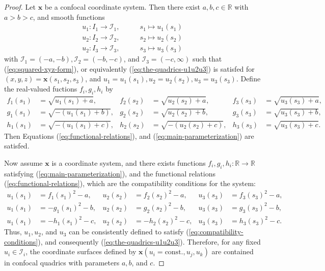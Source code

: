 \documentclass[10pt, a4paper]{article}
\theoremstyle{BoldTopSpacing}
\theoremstyle{BoldTopSpacing}
\theoremstyle{BoldTopSpacing}
\theoremstyle{BoldTopBottomSpacing}
\theoremstyle{BoldTopSpacing}
\theoremstyle{BoldTopBottomSpacing}
\theoremstyle{remark}
\begin{document}
\begin{proof}
Let $\boldsymbol{x}$ be a confocal coordinate system. Then there exist $a, b, c \in \mathbb{R}$ with $a > b > c$, and smooth functions
\begin{equation*}
\begin{aligned}
u_{1} : I_{1} \to \mathcal{I}_{1}, &\quad \quad s_{1} \mapsto u_{1}(s_{1}) \\
u_{2} : I_{2} \to \mathcal{I}_{2}, &\quad \quad s_{2} \mapsto u_{2}(s_{2}) \\
u_{2} : I_{3} \to \mathcal{I}_{3}, &\quad \quad s_{3} \mapsto u_{3}(s_{3})
\end{aligned}
\end{equation*}
with $\mathcal{I}_{1} = (-a, -b), \mathcal{I}_{2} = (-b, -c)$, and $\mathcal{I}_{3} = (-c, \infty)$ such that (\ref{eq:squared-xyz-form}), or equivalently (\ref{eq:the-quadrics-u1u2u3}) is satisfed for $(x, y, z) = \boldsymbol{x}(s_{1}, s_{2}, s_{3})$, and $u_{1} = u_{1}(s_{1}), u_{2} = u_{2}(s_{2}), u_{3} = u_{3}(s_{3})$. Define the real-valued fuctions $f_{i}, g_{i}, h_{i}$ by
\begin{equation}
\begin{aligned}
\label{eq:square-root-parametrization}
f_{1}(s_{1}) &= \sqrt{u_{1}(s_{1}) + a}, & f_{2}(s_{2}) &= \sqrt{u_{2}(s_{2}) + a}, & f_{3}(s_{3}) &= \sqrt{u_{3}(s_{3}) + a}, \\
g_{1}(s_{1}) &= \sqrt{-(u_{1}(s_{1}) + b)}, & g_{2}(s_{2}) &= \sqrt{u_{2}(s_{2}) + b}, & g_{3}(s_{3}) &= \sqrt{u_{3}(s_{3}) + b}, \\
h_{1}(s_{1}) &= \sqrt{-(u_{1}(s_{1}) + c)}, & h_{2}(s_{2}) &= \sqrt{-(u_{2}(s_{2}) + c)}, & h_{3}(s_{3}) &= \sqrt{u_{3}(s_{3}) + c}.
\end{aligned}
\end{equation}
Then Equations (\ref{eq:functional-relations}), and (\ref{eq:main-parameterization}) are satisfed. \par
Now assume $\boldsymbol{x}$ is a coordinate system, and there exists functions $f_{i}, g_{i}, h_{i} : \mathbb{R} \to \mathbb{R}$ satisfying (\ref{eq:main-parameterization}), and the functional relations (\ref{eq:functional-relations}), which are the compatibility conditions for the system:
\begin{equation}
\begin{aligned}
\label{eq:compatibility-conditions}
u_{1}(s_{1}) &= f_{1}(s_{1})^2 - a, & u_{2}(s_{2}) &= f_{2}(s_{2})^2 - a, & u_{3}(s_{3}) &= f_{3}(s_{3})^2 - a, \\
u_{1}(s_{1}) &= -g_{1}(s_{1})^2 - b, & u_{2}(s_{2}) &= g_{2}(s_{2})^2 - b, & u_{3}(s_{3}) &= g_{3}(s_{3})^2 - b, \\
u_{1}(s_{1}) &= -h_{1}(s_{1})^2 - c, & u_{2}(s_{2}) &= -h_{2}(s_{2})^2 - c, & u_{3}(s_{3}) &= h_{3}(s_{3})^2 - c.
\end{aligned}
\end{equation}
Thus, $u_{1}, u_{2}$, and $u_{3}$ can be consistently defined to satisfy (\ref{eq:compatibility-conditions}), and consequently (\ref{eq:the-quadrics-u1u2u3}). Therefore, for any fixed $u_{i} \in \mathcal{I}_{i}$, the coordinate surfaces defined by $\boldsymbol{x}(u_{i} = \text{const.}, u_{j}, u_{k})$ are contained in confocal quadrics with parameters $a, b$, and $c$.
\end{proof}
\end{document}
